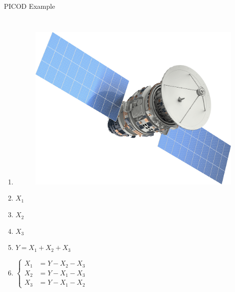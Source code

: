 \documentclass[xcolor=dvipsnames, aspectratio=169]{beamer}
\begin{document}
\begin{frame}{PICOD Example}
	\begin{columns}[c] %
		
		\begin{enumerate}[]
			
			
			\item<1->[]
			\begin{figure}
				\includegraphics[width=0.4\linewidth]{img/satelite}
			\end{figure}
			
			\item<2-4>[]\centering $X_1$
			\item<3-4>[] \centering$X_2$
			\item<4-4>[] \centering$X_3$
			\item<6->[] $Y = X_1 + X_2 + X_3 $
			\item<7->[] 
			$	\begin{cases}
				X_1 &= Y - X_2 - X_3 \\
				X_2 &= Y - X_1 - X_3  \\
				X_3 &= Y - X_1 - X_2  
			\end{cases}    $
			
		\end{enumerate}
		\centering
		\begin{tikzpicture}[->, >=stealth, auto, semithick]
			

\end{tikzpicture}
\end{columns}
\end{frame}
\end{document}

